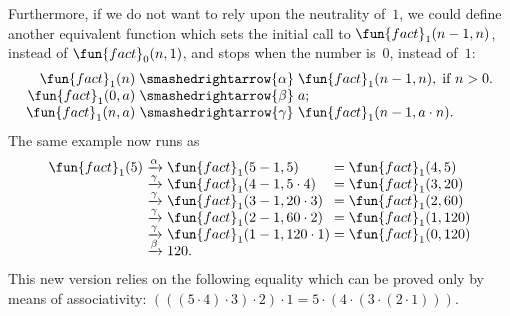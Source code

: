 Furthermore, if we do not want to rely upon the neutrality of~\(1\),
we could define another equivalent function  which
sets the initial call to \(\fun{fact}_1(n-1,n)\), instead of
\(\fun{fact}_0(n,1)\), and stops when the number is~\(0\), instead
of~\(1\):
\begin{equation*}
\begin{array}{r@{\;}c@{\;}l}
\fun{fact}_1(n) & \smashedrightarrow{\alpha} &
\fun{fact}_1(n-1,n),\;\text{if \(n > 0\)}.\\
\fun{fact}_1(0,a) & \smashedrightarrow{\beta} & a;\\
\fun{fact}_1(n,a) & \smashedrightarrow{\gamma} &
\fun{fact}_1(n-1,a \cdot n).
\end{array}
\end{equation*}
The same example now runs as
\begin{equation*}
\begin{array}{r@{\;}c@{\;}l@{\;}c@{\;}l}
\fun{fact}_1(5)
& \xrightarrow{\smash[t]{\alpha}} & \fun{fact}_1(5-1,5)
& = & \fun{fact}_1(4,5)\\
& \xrightarrow{\smash[t]{\gamma}} & \fun{fact}_1(4-1,5 \cdot 4)
& = & \fun{fact}_1(3,20)\\
& \xrightarrow{\smash[t]{\gamma}} & \fun{fact}_1(3-1,20 \cdot 3)
& = & \fun{fact}_1(2,60)\\
& \xrightarrow{\smash[t]{\gamma}} & \fun{fact}_1(2-1,60 \cdot 2)
& = & \fun{fact}_1(1,120)\\
& \xrightarrow{\smash[t]{\gamma}} & \fun{fact}_1(1-1,120 \cdot 1)
& = & \fun{fact}_1(0,120)\\
& \xrightarrow{\smash[t]{\beta}} & 120.
\end{array}
\end{equation*}
This new version relies on the following equality which can be proved
only by means of associativity: \((((5 \cdot 4) \cdot 3) \cdot 2)
\cdot 1 = 5 \cdot (4 \cdot (3 \cdot (2 \cdot 1)))\).

